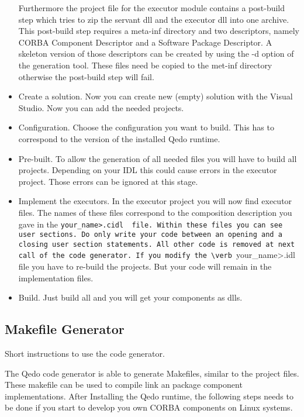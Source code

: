 \documentclass[12pt,a4paper]{report}
\begin{document}
\begin{itemize}
Furthermore the project file for the executor module contains a post-build step which tries to zip the servant dll and the executor dll into one archive. This post-build step requires a meta-inf directory and two descriptors, namely CORBA Component Descriptor and a Software Package Descriptor. A skeleton version of those descriptors can be created by using the -d option of the generation tool. These files need be copied to the met-inf directory otherwise the post-build step will fail.

	\item Create a solution. Now you can create new (empty) solution with the Visual Studio. Now you can add the needed projects. 

	\item Configuration. Choose the configuration you want to build. This has to correspond to the version of the installed Qedo runtime.

	\item Pre-built.
	To allow the generation of all needed files you will have to build all projects. Depending on your IDL this could cause errors in the executor project. Those errors can be ignored at this stage.

	\item Implement the executors. 
	In the executor project you will now find executor files. The names of these files correspond to the composition description you gave in the \verb <your_name>.cidl  file. Within these files you can see user sections. Do only write your code between an opening and a closing user section statements. All other code is removed at next call of the code generator. If you modify the \verb <your_name>.idl  file you have to re-build the projects. But your code will remain in the implementation files.

	\item Build. Just build all and you will get your components as dlls.

\end{itemize}

\subsection{Makefile Generator}
\label{sec:MakefileGenerator}

Short instructions to use the code generator.

The Qedo code generator is able to generate Makefiles, similar to the project files. These makefile can be used to compile link an package component implementations.
After Installing the Qedo runtime, the following steps needs to be done if you start to develop you own CORBA components on Linux systems.
\end{document}
